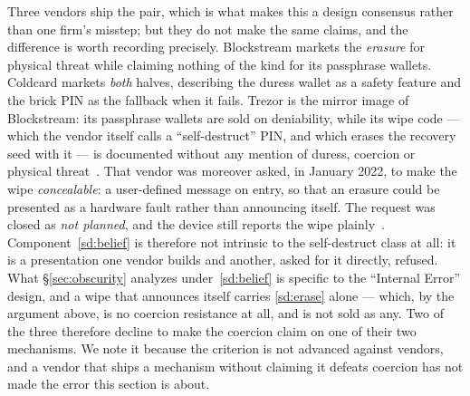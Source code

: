 \begin{remark}
\label{rem:vendor-claims}
Three vendors ship the pair, which is what makes this a design consensus rather
than one firm's misstep; but they do not make the same claims, and the
difference is worth recording precisely. Blockstream markets the \emph{erasure}
for physical threat while claiming nothing of the kind for its passphrase
wallets. Coldcard markets \emph{both} halves, describing the duress wallet as a
safety feature and the brick PIN as the fallback when it fails. Trezor is the
mirror image of Blockstream: its passphrase wallets are sold on deniability,
while its wipe code --- which the vendor itself calls a ``self-destruct'' PIN,
and which erases the recovery seed with it --- is documented without any mention
of duress, coercion or physical threat~\cite{trezor-wipe-code}. That vendor was
moreover asked, in January 2022, to make the wipe \emph{concealable}: a
user-defined message on entry, so that an erasure could be presented as a
hardware fault rather than announcing itself. The request was closed as \emph{not
planned}, and the device still reports the wipe
plainly~\cite{trezor-wipe-deniability}. Component~\ref{sd:belief} is therefore
not intrinsic to the self-destruct class at all: it is a presentation one vendor
builds and another, asked for it directly, refused. What \S\ref{sec:obscurity}
analyzes under~\ref{sd:belief} is specific to the ``Internal Error'' design, and
a wipe that announces itself carries \ref{sd:erase} alone --- which, by the
argument above, is no coercion resistance at all, and is not sold as any. Two of the three
therefore decline to make the coercion claim on one of their two mechanisms. We
note it because the criterion is not advanced against vendors, and a vendor that
ships a mechanism without claiming it defeats coercion has not made the error
this section is about.
\end{remark}

